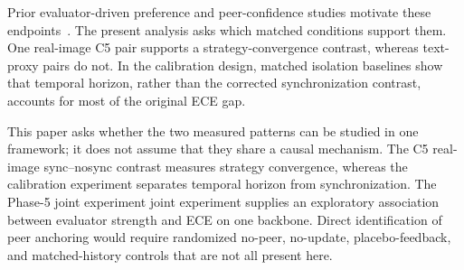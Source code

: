 \documentclass[11pt]{article}
\begin{document}
Prior evaluator-driven preference and peer-confidence studies motivate these endpoints~\cite{liu2026impossible,liu2026epc,liu2026calibration}. The present analysis asks which matched conditions support them. One real-image C5 pair supports a strategy-convergence contrast, whereas text-proxy pairs do not. In the calibration design, matched isolation baselines show that temporal horizon, rather than the corrected synchronization contrast, accounts for most of the original ECE gap.

This paper asks whether the two measured patterns can be studied in one framework; it does not assume that they share a causal mechanism. The C5 real-image sync--nosync contrast measures strategy convergence, whereas the calibration experiment separates temporal horizon from synchronization. The Phase-5 joint experiment joint experiment supplies an exploratory association between evaluator strength and ECE on one backbone. Direct identification of peer anchoring would require randomized no-peer, no-update, placebo-feedback, and matched-history controls that are not all present here.
\end{document}
